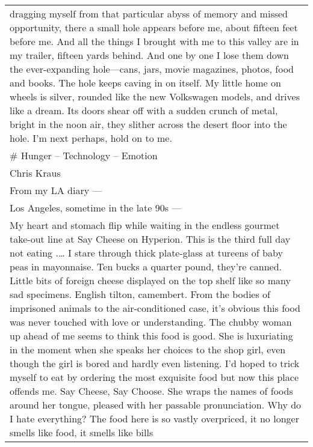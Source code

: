 \begin{longtable}[]{@{}l@{}}
\begin{minipage}[t]{0.97\columnwidth}
dragging myself from that particular abyss of memory and missed
opportunity, there a small hole appears before me, about fifteen feet
before me. And all the things I brought with me to this valley are in my
trailer, fifteen yards behind. And one by one I lose them down the
ever-expanding hole---cans, jars, movie magazines, photos, food and
books. The hole keeps caving in on itself. My little home on wheels is
silver, rounded like the new Volkswagen models, and drives like a dream.
Its doors shear off with a sudden crunch of metal, bright in the noon
air, they slither across the desert floor into the hole. I'm next
perhaps, hold on to me.\strut
\end{minipage}\tabularnewline
\begin{minipage}[t]{0.97\columnwidth}\raggedright
\# Hunger -- Technology -- Emotion\strut
\end{minipage}\tabularnewline
\begin{minipage}[t]{0.97\columnwidth}\raggedright
Chris Kraus\strut
\end{minipage}\tabularnewline
\begin{minipage}[t]{0.97\columnwidth}\raggedright
From my LA diary ---\strut
\end{minipage}\tabularnewline
\begin{minipage}[t]{0.97\columnwidth}\raggedright
Los Angeles, sometime in the late 90s ---\strut
\end{minipage}\tabularnewline
\begin{minipage}[t]{0.97\columnwidth}\raggedright
My heart and stomach flip while waiting in the endless gourmet take-out
line at Say Cheese on Hyperion. This is the third full day not eating
.\ldots{} I stare through thick plate-glass at tureens of baby peas in
mayonnaise. Ten bucks a quarter pound, they're canned. Little bits of
foreign cheese displayed on the top shelf like so many sad specimens.
English tilton, camembert. From the bodies of imprisoned animals to the
air-conditioned case, it's obvious this food was never touched with love
or understanding. The chubby woman up ahead of me seems to think this
food is good. She is luxuriating in the moment when she speaks her
choices to the shop girl, even though the girl is bored and hardly even
listening. I'd hoped to trick myself to eat by ordering the most
exquisite food but now this place offends me. Say Cheese, Say Choose.
She wraps the names of foods around her tongue, pleased with her
passable pronunciation. Why do I hate everything? The food here is so
vastly overpriced, it no longer smells like food, it smells like bills

\end{minipage}
\end{longtable}
